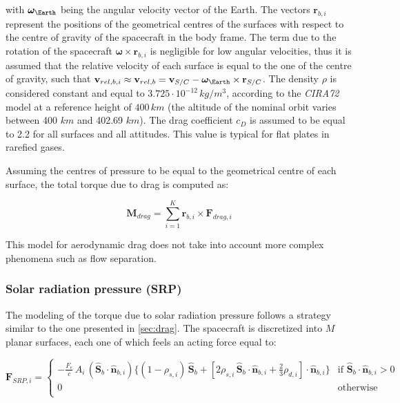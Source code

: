 with $\bm{\omega}_{\Earth}$ being the angular velocity vector of the Earth. The vectors $\mathbf{r}_{b,i}$ represent the positions of the geometrical centres of the surfaces with respect to the centre of gravity of the spacecraft in the body frame. The term due to the rotation of the spacecraft $\bm{\omega} \times \mathbf{r}_{b,i}$ is negligible for low angular velocities, thus it is assumed that the relative velocity of each surface is equal to the one of the centre of gravity, such that $\textbf{v}_{rel,b,i} \approx \mathbf{v}_{rel,b} = \mathbf{v}_{S/C} - \bm{\omega}_{\Earth} \times \mathbf{r}_{S/C}$. The density $\rho$ is considered constant and equal to $3.725 \cdot 10^{-12}\, kg/m^3$, according to the \textit{CIRA72} model \cite{cira72} at a reference height of $400\,km$ (the altitude of the nominal orbit varies between 400 $km$ and 402.69 $km$). The drag coefficient $c_D$ is assumed to be equal to 2.2 for all surfaces and all attitudes. This value is typical for flat plates in rarefied gases.

Assuming the centres of pressure to be equal to the geometrical centre of each surface, the total torque due to drag is computed as:

\begin{equation}
    \mathbf{M}_{drag} = \sum_{i=1}^K \mathbf{r}_{b,i} \times \mathbf{F}_{drag,i}
\end{equation}

This model for aerodynamic drag does not take into account more complex phenomena such as flow separation.

\subsubsection{Solar radiation pressure (SRP)} \label{sec:SRP}

The modeling of the torque due to solar radiation pressure follows a strategy similar to the one presented in \cref{sec:drag}. The spacecraft is discretized into $M$ planar surfaces, each one of which feels an acting force equal to:

\begin{equation}
    \mathbf{F}_{SRP,i} = 
    \begin{cases}
        - \frac{F_e}{c}\, A_i \, \left( \hat{\mathbf{S}}_b \cdot \hat{\mathbf{n}}_{b,i} \right) \bigg\{ (1 - \rho_{s,i})\, \hat{\mathbf{S}}_b + \left[ 2 \rho_{s,i} \, \hat{\mathbf{S}}_b \cdot \hat{\mathbf{n}}_{b,i} + \frac{2}{3} \rho_{d,i} \right] \cdot \hat{\mathbf{n}}_{b,i} \bigg\} & \text{if } \hat{\mathbf{S}}_b \cdot \hat{\mathbf{n}}_{b,i} > 0 \\
        0 & \text{otherwise} \\
    \end{cases}
\end{equation}

